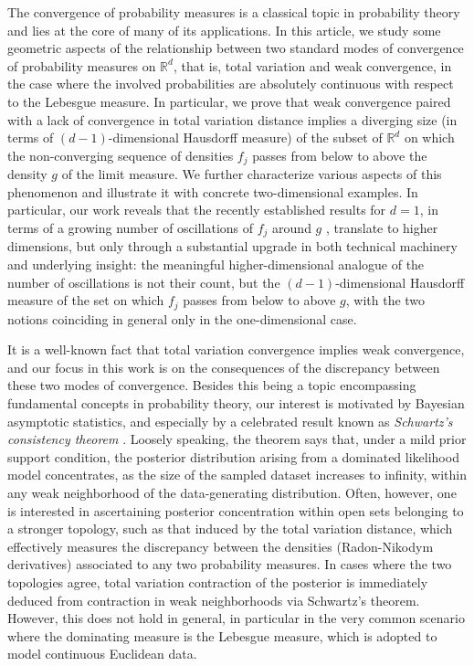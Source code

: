 \documentclass[12pt]{article}
\begin{document}
The convergence of  probability measures \citep{billingsley1999} is a classical topic in probability theory and lies at the core of many of its applications. In this article, we study some geometric aspects of the relationship between two standard modes of convergence of probability measures on $\mathbb R^d$, that is, total variation and weak convergence, in the case where the involved probabilities are absolutely continuous with respect to the Lebesgue measure. In particular, we prove that weak convergence paired with a lack of convergence in total variation distance implies a diverging size (in terms of $(d-1)$-dimensional Hausdorff measure) of the subset of $\mathbb R^d$ on which the non-converging sequence of densities $f_j$ passes from below to above the density $g$ of the limit measure. We further characterize various aspects of this phenomenon and illustrate it with concrete two-dimensional examples. In particular, our work reveals that the recently established results for $d=1$, in terms of a growing number of oscillations of $f_j$ around $g$ \citep{bariletto2025identifiability}, translate to higher dimensions, but only through a substantial upgrade in both technical machinery and underlying insight: the meaningful higher-dimensional analogue of the number of oscillations is not their count, but the $(d-1)$-dimensional Hausdorff measure of the set on which $f_j$ passes from below to above $g$, with the two notions coinciding in general only in the one-dimensional case.

It is a well-known fact that total variation convergence implies weak convergence, and our focus in this work is on the  consequences of the discrepancy between these two modes of convergence. Besides this being a topic encompassing fundamental concepts in probability theory, our interest is motivated by Bayesian asymptotic statistics, and especially by a celebrated result known as \emph{Schwartz's consistency theorem} \citep{schwartz1965}. Loosely speaking, the theorem says that, under a mild prior support condition, the posterior distribution arising from a dominated likelihood model concentrates, as the size of the sampled dataset increases to infinity, within any weak neighborhood of the data-generating distribution. Often, however, one is interested in ascertaining posterior concentration within open sets belonging to a stronger topology, such as that induced by the total variation distance, which effectively measures the discrepancy between the densities (Radon-Nikodym derivatives) associated to any two probability measures. In cases where the two topologies agree, total variation contraction of the posterior is immediately deduced from contraction in weak neighborhoods via Schwartz's theorem. However, this does not hold in general, in particular in the very common scenario where the dominating measure is the Lebesgue measure, which is adopted to model continuous Euclidean data.
\end{document}

